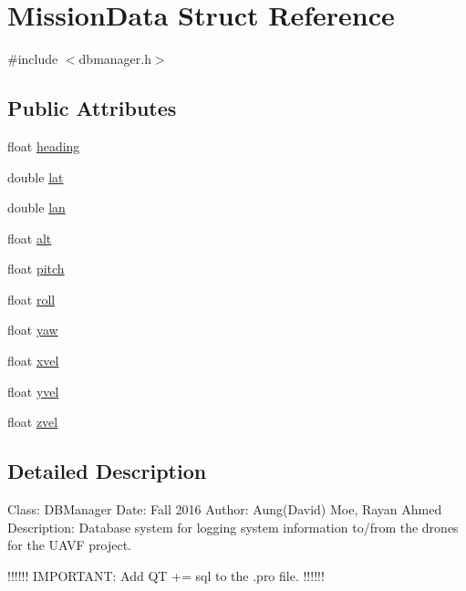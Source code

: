 \hypertarget{struct_mission_data}{}\section{Mission\+Data Struct Reference}
\label{struct_mission_data}


{\ttfamily \#include $<$dbmanager.\+h$>$}

\subsection*{Public Attributes}
\begin{DoxyCompactItemize}
\item 
float \hyperlink{struct_mission_data_aca98e398b94037e80749d0a9e73dcefe}{heading}
\item 
double \hyperlink{struct_mission_data_a36cf42a5d8fd328293d296c67239af9b}{lat}
\item 
double \hyperlink{struct_mission_data_a7fcee2655bd219b949d4a697ecc70a67}{lan}
\item 
float \hyperlink{struct_mission_data_ad4f9f598f5960f26fc8290180a7cfd18}{alt}
\item 
float \hyperlink{struct_mission_data_a43974cedf16a4aa6645145224a4c3e77}{pitch}
\item 
float \hyperlink{struct_mission_data_a9fca0a04ef126efa755e91c2a96a536e}{roll}
\item 
float \hyperlink{struct_mission_data_a186d118b99361b39a581ae01cf20e2c3}{yaw}
\item 
float \hyperlink{struct_mission_data_a6a86665d3ace692fec591d90ef69d7b3}{xvel}
\item 
float \hyperlink{struct_mission_data_a0551fec33eeabd071cebf089603ed122}{yvel}
\item 
float \hyperlink{struct_mission_data_abe305df8910d25abeb1638dd6693081b}{zvel}
\end{DoxyCompactItemize}


\subsection{Detailed Description}
Class\+: D\+B\+Manager Date\+: Fall 2016 Author\+: Aung(\+David) Moe, Rayan Ahmed Description\+: Database system for logging system information to/from the drones for the U\+A\+V\+F project.

!!!!!! I\+M\+P\+O\+R\+T\+A\+N\+T\+: Add \textquotesingle{}Q\+T += sql\textquotesingle{} to the .pro file. !!!!!!


